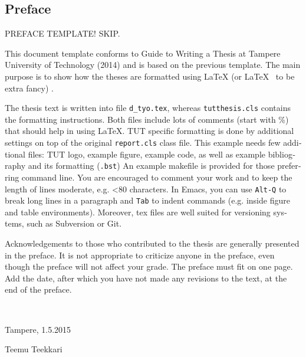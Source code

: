 \documentclass[12pt,a4paper,english]{tutthesis}
\begin{document}
\begin{otherlanguage}{english} %
\makeatother %

%
%
\chapter*{Preface}

PREFACE TEMPLATE! SKIP.

This document template conforms to Guide to Writing a Thesis at
Tampere University of Technology (2014) and is based on the previous
template. The main purpose is to show how the theses are formatted
using LaTeX (or \LaTeX ~ to be extra fancy) .


The thesis text is written into file \texttt{d\_tyo.tex}, whereas
\texttt{tutthesis.cls} contains the formatting instructions. Both
files include lots of comments (start with \%) that should help in
using LaTeX. TUT specific formatting is done by additional settings on
top of the original \texttt{report.cls} class file. This example needs
few additional files: TUT logo, example figure, example code, as well
as example bibliography and its formatting (\texttt{.bst}) An example
makefile is provided for those preferring command line. You are
encouraged to comment your work and to keep the length of lines
moderate, e.g. <80 characters. In Emacs, you can use \texttt{Alt-Q} to
break long lines in a paragraph and \texttt{Tab} to indent commands
(e.g. inside figure and table environments). Moreover, tex files are
well suited for versioning systems, such as Subversion or Git.  

Acknowledgements to those who contributed to the thesis are generally
presented in the preface. It is not appropriate to criticize anyone in
the preface, even though the preface will not affect your grade. The
preface must fit on one page. Add the date, after which you have not
made any revisions to the text, at the end of the preface.

~ 

Tampere, 1.5.2015
~


Teemu Teekkari
%
%


\end{otherlanguage}
\end{document}
